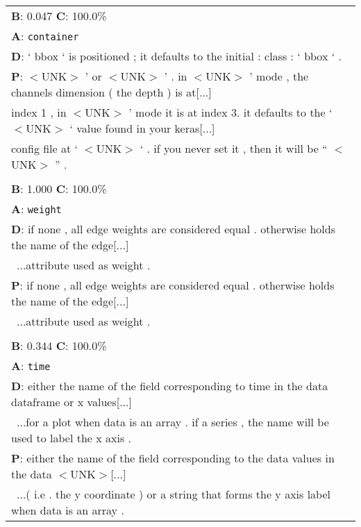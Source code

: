 \begin{table}
\begin{center}
\begin{tabular}{l}
\textbf{B}: 0.047
\textbf{C}: 100.0\%  \\
\textbf{A}: \texttt{container}\\
\textbf{D}: ` bbox ` is positioned ; it defaults to the initial : class : ` bbox ` .\\
\textbf{P}: $<$UNK$>$ ' or $<$UNK$>$ ' . in $<$UNK$>$ ' mode , the channels dimension ( the depth ) is at[...]\\
 index 1 , in $<$UNK$>$ ' mode it is at index 3. it defaults to the ` $<$UNK$>$ ` value found in your keras[...]\\
  config file at ` $<$UNK$>$ ` . if you never set it , then it will be `` $<$UNK$>$ '' . \\
\\
\textbf{B}: 1.000
\textbf{C}: 100.0\%  \\
\textbf{A}: \texttt{weight}\\
\textbf{D}: if none , all edge weights are considered equal . otherwise holds the name of the edge[...]\\\
...attribute used as weight .\\
\textbf{P}: if none , all edge weights are considered equal . otherwise holds the name of the edge[...]\\\
...attribute used as weight . \\
\\
\textbf{B}: 0.344
\textbf{C}: 100.0\%  \\
\textbf{A}: \texttt{time}\\
\textbf{D}: either the name of the field corresponding to time in the data dataframe or x values[...]\\\
...for a plot when data is an array . if a series , the name will be used to label the x axis .\\
\textbf{P}: either the name of the field corresponding to the data values in the data $<$UNK$>$[...]\\\
...( i.e . the y coordinate ) or a string that forms the y axis label when data is an array . \\

\end{tabular}
\end{center}
\end{table}


